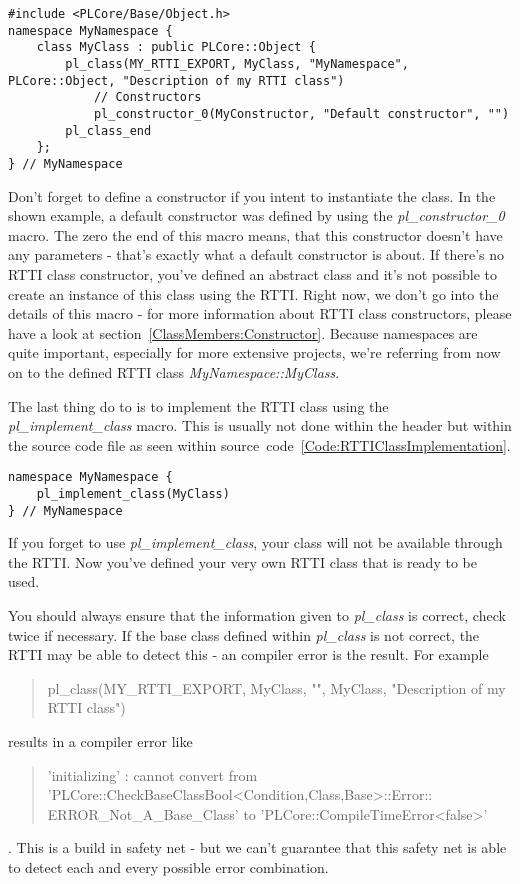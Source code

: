 \begin{lstlisting}[float=htb,label=Code:RTTIClassDefinitionWithNamespace,caption={Defining a new \ac{RTTI} class with namespace}]
#include <PLCore/Base/Object.h>
namespace MyNamespace {
	class MyClass : public PLCore::Object {
		pl_class(MY_RTTI_EXPORT, MyClass, "MyNamespace", PLCore::Object, "Description of my RTTI class")
			// Constructors
			pl_constructor_0(MyConstructor, "Default constructor", "")
		pl_class_end
	};
} // MyNamespace
\end{lstlisting}
Don't forget to define a constructor if you intent to instantiate the class. In the shown example, a default constructor was defined by using the \emph{pl\_constructor\_0} macro.  The zero the end of this macro means, that this constructor doesn't have any parameters - that's exactly what a default constructor is about. If there's no \ac{RTTI} class constructor, you've defined an abstract class and it's not possible to create an instance of this class using the \ac{RTTI}. Right now, we don't go into the details of this macro - for more information about \ac{RTTI} class constructors, please have a look at section~\ref{ClassMembers:Constructor}. Because namespaces are quite important, especially for more extensive projects, we're referring from now on to the defined \ac{RTTI} class \emph{MyNamespace::MyClass}.

The last thing do to is to implement the \ac{RTTI} class using the \emph{pl\_implement\_class} macro. This is usually not done within the header but within the source code file as seen within source~code~\ref{Code:RTTIClassImplementation}.
\begin{lstlisting}[float=htb,label=Code:RTTIClassImplementation,caption={Implementing a new \ac{RTTI} class}]
namespace MyNamespace {
	pl_implement_class(MyClass)
} // MyNamespace
\end{lstlisting}
If you forget to use \emph{pl\_implement\_class}, your class will not be available through the \ac{RTTI}. Now you've defined your very own \ac{RTTI} class that is ready to be used.

You should always ensure that the information given to \emph{pl\_class} is correct, check twice if necessary. If the base class defined within \emph{pl\_class} is not correct, the \ac{RTTI} may be able to detect this - an compiler error is the result. For example \begin{quote}pl\_class(MY\_RTTI\_EXPORT, MyClass, "", MyClass, "Description of my RTTI class")\end{quote} results in a compiler error like \begin{quote}'initializing' : cannot convert from\\'PLCore::CheckBaseClassBool<Condition,Class,Base>::Error::\\ERROR\_Not\_A\_Base\_Class' to 'PLCore::CompileTimeError<false>'\end{quote}. This is a build in safety net - but we can't guarantee that this safety net is able to detect each and every possible error combination.


